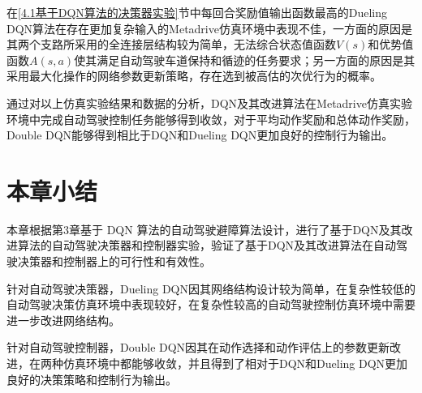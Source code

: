 在\ref{4.1基于DQN算法的决策器实验}节中每回合奖励值输出函数最高的Dueling DQN算法在存在更加复杂输入的Metadrive仿真环境中表现不佳，一方面的原因是其两个支路所采用的全连接层结构较为简单，无法综合状态值函数$V(s)$和优势值函数$A(s,a)$使其满足自动驾驶车道保持和循迹的任务要求；另一方面的原因是其采用最大化操作的网络参数更新策略，存在选到被高估的次优行为的概率。

通过对以上仿真实验结果和数据的分析，DQN及其改进算法在Metadrive仿真实验环境中完成自动驾驶控制任务能够得到收敛，对于平均动作奖励和总体动作奖励，Double DQN能够得到相比于DQN和Dueling DQN更加良好的控制行为输出。

\section{本章小结}

本章根据第3章基于 DQN 算法的自动驾驶避障算法设计，进行了基于DQN及其改进算法的自动驾驶决策器和控制器实验，验证了基于DQN及其改进算法在自动驾驶决策器和控制器上的可行性和有效性。

针对自动驾驶决策器，Dueling DQN因其网络结构设计较为简单，在复杂性较低的自动驾驶决策仿真环境中表现较好，在复杂性较高的自动驾驶控制仿真环境中需要进一步改进网络结构。

针对自动驾驶控制器，Double DQN因其在动作选择和动作评估上的参数更新改进，在两种仿真环境中都能够收敛，并且得到了相对于DQN和Dueling DQN更加良好的决策策略和控制行为输出。
